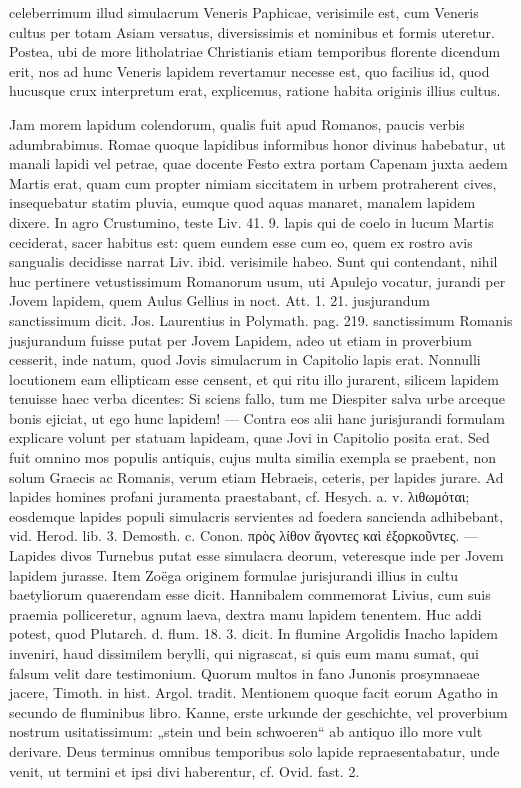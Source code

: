 \documentclass[a4paper, 11pt, oneside, polutonikogreek, german]{article}
\begin{document}
celeberrimum illud simulacrum Veneris Paphicae, verisimile est, cum Veneris cultus per totam Asiam versatus, diversissimis et nominibus et formis uteretur. Postea, ubi de more litholatriae Christianis etiam temporibus florente dicendum erit, nos ad hunc Veneris lapidem revertamur necesse est, quo facilius id, quod hucusque crux interpretum erat, explicemus, ratione habita originis illius cultus.

Jam morem lapidum colendorum, qualis fuit apud Romanos, paucis verbis adumbrabimus. Romae quoque lapidibus informibus honor divinus habebatur, ut manali lapidi vel petrae, quae docente Festo extra portam Capenam juxta aedem Martis erat, quam cum propter nimiam siccitatem in urbem protraherent cives, insequebatur statim pluvia, eumque quod aquas manaret, manalem lapidem dixere. In agro Crustumino, teste Liv. 41. 9. lapis qui de coelo in lucum Martis ceciderat, sacer habitus est: quem eundem esse cum eo, quem ex rostro avis sangualis decidisse narrat Liv. ibid. verisimile habeo. Sunt qui contendant, nihil huc pertinere vetustissimum Romanorum usum, uti Apulejo vocatur, jurandi per Jovem lapidem, quem Aulus Gellius in noct. Att. 1. 21. jusjurandum sanctissimum dicit. Jos. Laurentius in Polymath. pag. 219. sanctissimum Romanis jusjurandum fuisse putat per Jovem Lapidem, adeo ut etiam in proverbium cesserit, inde natum, quod Jovis simulacrum in Capitolio lapis erat. Nonnulli locutionem eam ellipticam esse censent, et qui ritu illo jurarent, silicem lapidem tenuisse haec verba dicentes: Si sciens fallo, tum me Diespiter salva urbe arceque bonis ejiciat, ut ego hunc lapidem! --- Contra eos alii hanc jurisjurandi formulam explicare volunt per statuam lapideam, quae Jovi in Capitolio posita erat. Sed fuit omnino mos populis antiquis, cujus multa similia exempla se praebent, non solum Graecis ac Romanis, verum etiam Hebraeis, ceteris, per lapides jurare. Ad lapides homines profani juramenta praestabant, cf. Hesych. a. v. λιθωμόται; eosdemque lapides populi simulacris servientes ad foedera sancienda adhibebant, vid. Herod. lib. 3. Demosth. c. Conon. πρὸς λίθον ἄγοντες καὶ ἐξορκοῦντες. --- Lapides divos Turnebus putat esse simulacra deorum, veteresque inde per Jovem lapidem jurasse. Item Zoëga originem formulae jurisjurandi illius in cultu baetyliorum quaerendam esse dicit. Hannibalem commemorat Livius, cum suis praemia polliceretur, agnum laeva, dextra manu lapidem tenentem. Huc addi potest, quod Plutarch. d. flum. 18. 3. dicit. In flumine Argolidis Inacho lapidem inveniri, haud dissimilem berylli, qui nigrascat, si quis eum manu sumat, qui falsum velit dare testimonium. Quorum multos in fano Junonis prosymnaeae jacere, Timoth. in hist. Argol. tradit. Mentionem quoque facit eorum Agatho in secundo de fluminibus libro. Kanne, erste urkunde der geschichte, vel proverbium nostrum usitatissimum: „stein und bein schwoeren“ ab antiquo illo more vult derivare. Deus terminus omnibus temporibus solo lapide repraesentabatur, unde venit, ut termini et ipsi divi haberentur, cf. Ovid. fast. 2.
\end{document}
